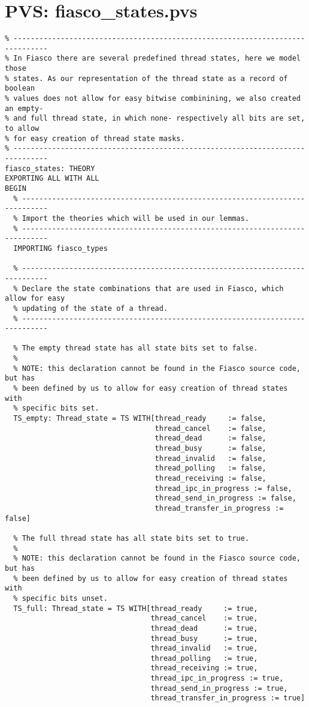 \hypertarget{pvs_fiasco_states}{\chapter{PVS: fiasco\_states.pvs}}
\lstset{language=PVS}
\begin{lstlisting}
% ------------------------------------------------------------------------------
% In Fiasco there are several predefined thread states, here we model those
% states. As our representation of the thread state as a record of boolean
% values does not allow for easy bitwise combinining, we also created an empty-
% and full thread state, in which none- respectively all bits are set, to allow
% for easy creation of thread state masks.
% ------------------------------------------------------------------------------
fiasco_states: THEORY
EXPORTING ALL WITH ALL
BEGIN
  % ----------------------------------------------------------------------------
  % Import the theories which will be used in our lemmas.
  % ----------------------------------------------------------------------------
  IMPORTING fiasco_types

  % ----------------------------------------------------------------------------
  % Declare the state combinations that are used in Fiasco, which allow for easy
  % updating of the state of a thread.
  % ----------------------------------------------------------------------------

  % The empty thread state has all state bits set to false.
  %
  % NOTE: this declaration cannot be found in the Fiasco source code, but has 
  % been defined by us to allow for easy creation of thread states with 
  % specific bits set.
  TS_empty: Thread_state = TS WITH[thread_ready     := false,
                                   thread_cancel    := false,
                                   thread_dead      := false,
                                   thread_busy      := false,
                                   thread_invalid   := false,
                                   thread_polling   := false,
                                   thread_receiving := false,
                                   thread_ipc_in_progress := false,
                                   thread_send_in_progress := false,
                                   thread_transfer_in_progress := false]

  % The full thread state has all state bits set to true.
  %
  % NOTE: this declaration cannot be found in the Fiasco source code, but has 
  % been defined by us to allow for easy creation of thread states with 
  % specific bits unset.
  TS_full: Thread_state = TS WITH[thread_ready     := true,
                                  thread_cancel    := true,
                                  thread_dead      := true,
                                  thread_busy      := true,
                                  thread_invalid   := true,
                                  thread_polling   := true,
                                  thread_receiving := true,
                                  thread_ipc_in_progress := true,
                                  thread_send_in_progress := true,
                                  thread_transfer_in_progress := true]


\end{lstlisting}
